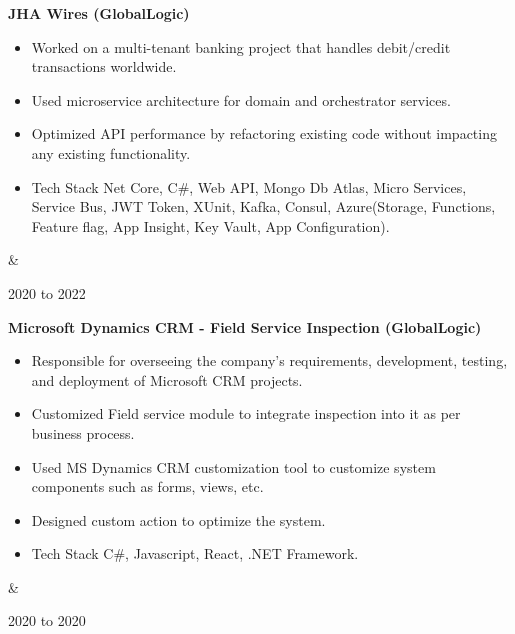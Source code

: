 \documentclass[10pt, letterpaper]{article}
\newenvironment{highlights}{
        \begin{itemize}[
                topsep=0pt,
                parsep=0.10 cm,
                partopsep=0pt,
                itemsep=0pt,
                after=\vspace{-1\baselineskip},
                leftmargin=0.4 cm + 3pt
            ]
    }{
        \end{itemize}
    } %
\let\originalTabularx\tabularx
\let\originalEndTabularx\endtabularx
\renewenvironment{tabularx}{\bgroup\centering\originalTabularx}{\originalEndTabularx\par\egroup}
\begin{document}
        \vspace{0.2 cm}
        \begin{tabularx}{
            \textwidth-0.4 cm-0.13cm
        }{
            K{0.2 cm}
            R{4.1 cm}
        }
            \textbf{JHA Wires (GlobalLogic)}

            \vspace{0.10 cm}

            \begin{highlights}
                \item Worked on a multi-tenant banking project that handles debit/credit transactions worldwide.
                \item Used microservice architecture for domain and orchestrator services.
                \item Optimized API performance by refactoring existing code without impacting any existing functionality.
                \item Tech Stack Net Core, C\#, Web API, Mongo Db Atlas, Micro Services, Service Bus, JWT Token, XUnit, Kafka, Consul, Azure(Storage, Functions, Feature flag, App Insight, Key Vault, App Configuration).
            \end{highlights}
            &
            

            2020 to 2022
        \end{tabularx}


        \vspace{0.2 cm}
        \begin{tabularx}{
            \textwidth-0.4 cm-0.13cm
        }{
            K{0.2 cm}
            R{4.1 cm}
        }
            \textbf{Microsoft Dynamics CRM - Field Service Inspection (GlobalLogic)}

            \vspace{0.10 cm}

            \begin{highlights}
                \item Responsible for overseeing the company's requirements, development, testing, and deployment of Microsoft CRM projects.
                \item Customized Field service module to integrate inspection into it as per business process.
                \item Used MS Dynamics CRM customization tool to customize system components such as forms, views, etc.
                \item Designed custom action to optimize the system.
                \item Tech Stack C\#, Javascript, React, .NET Framework.
            \end{highlights}
            &
            

            2020 to 2020
        \end{tabularx}
\end{document}

